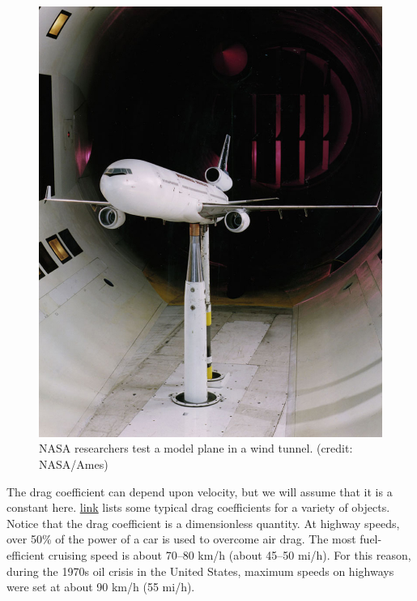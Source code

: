 \documentclass[
]{book}
\begin{document}
\begin{figure}
\hypertarget{import-auto-id1165298787035}{%
\centering
\includegraphics{images/Figure_06_02_03a.jpg}
\caption{NASA researchers test a model plane in a wind tunnel. (credit:
NASA/Ames)}\label{import-auto-id1165298787035}
}
\end{figure}

The drag coefficient can depend upon velocity, but we will assume that
it is a constant here.
\protect\hyperlink{import-auto-id1165298535568}{link} lists some
typical drag coefficients for a variety of objects. Notice that the drag
coefficient is a dimensionless quantity. At highway speeds, over 50\% of
the power of a car is used to overcome air drag. The most fuel-efficient
cruising speed is about 70--80 km/h (about 45--50 mi/h). For this
reason, during the 1970s oil crisis in the United States, maximum speeds
on highways were set at about 90 km/h (55 mi/h).
\end{document}
